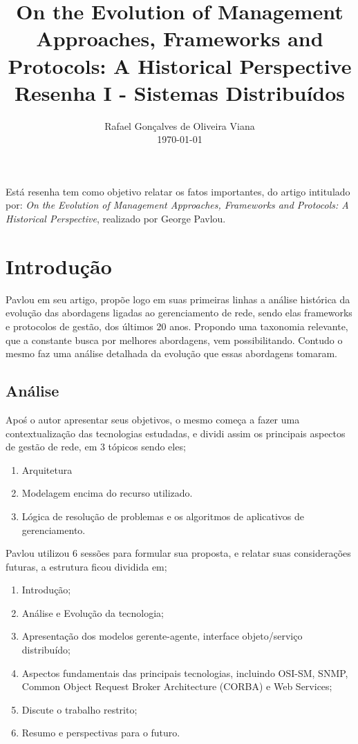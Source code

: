 \documentclass[12pt]{article}
\title{On the Evolution of Management Approaches,
		Frameworks and Protocols: A Historical Perspective\\ Resenha I - Sistemas Distribuídos}
\author{Rafael Gonçalves de Oliveira Viana\inst{1} \\\vspace*{10pt} \normalsize  \today{} }
\begin{document}
 

\maketitle

     
\begin{resumo} 	
  Está resenha tem como objetivo relatar os fatos importantes, do artigo intitulado por: \textit{On the Evolution of Management Approaches,
  Frameworks and Protocols: A Historical Perspective}, realizado por George Pavlou.
\end{resumo}



\section{Introdução}
 Pavlou em seu artigo, propõe logo em suas primeiras linhas a análise histórica da evolução das abordagens ligadas ao gerenciamento de rede, sendo elas frameworks e protocolos de gestão, dos últimos 20 anos. Propondo uma taxonomia relevante, que a constante busca por melhores abordagens, vem possibilitando. Contudo o mesmo faz uma análise detalhada da evolução que essas abordagens tomaram.
\subsection{Análise}
 Apoś o autor apresentar seus objetivos, o mesmo começa a fazer uma contextualização das tecnologias estudadas, e dividi assim os principais aspectos de gestão de rede, em 3 tópicos sendo eles;

	 \begin{enumerate}
	 	\item Arquitetura
	 	\item Modelagem encima do recurso utilizado.
	 	\item Lógica de resolução de problemas e os algoritmos de aplicativos de gerenciamento.
	 \end{enumerate}
 
	Pavlou utilizou 6 sessões para formular sua proposta, e relatar suas considerações futuras, a estrutura ficou dividida em; 
  \begin{enumerate}
  	\item Introdução;
  	\item Análise e Evolução da tecnologia;
  	\item Apresentação dos modelos gerente-agente, interface objeto/serviço distribuído;
  	\item Aspectos fundamentais das principais tecnologias, incluindo OSI-SM, SNMP, Common Object Request Broker Architecture (CORBA) e Web Services;
  	\item Discute o trabalho restrito;
  	\item Resumo e perspectivas para o futuro. 	
 	
 \end{enumerate}
\end{document}
